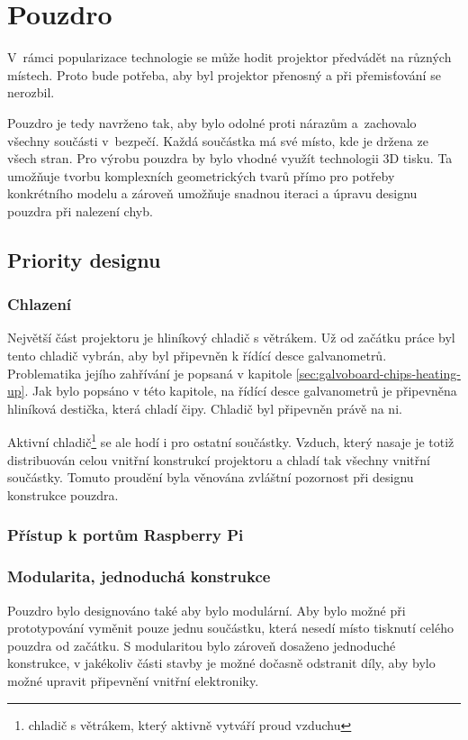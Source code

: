 \section{Pouzdro}

V~rámci popularizace technologie se může hodit projektor předvádět na různých místech. Proto bude potřeba, aby byl projektor přenosný a při přemisťování se nerozbil.

Pouzdro je tedy navrženo tak, aby bylo odolné proti nárazům a~zachovalo všechny součásti v~bezpečí. Každá součástka má své místo, kde je držena ze všech stran. Pro výrobu pouzdra by bylo vhodné využít technologii 3D tisku. Ta umožňuje tvorbu komplexních geometrických tvarů přímo pro potřeby konkrétního modelu a zároveň umožňuje snadnou iteraci a úpravu designu pouzdra při nalezení chyb.

\subsection{Priority designu} \label{sec:krabick-design-priorities}
\subsubsection{Chlazení}
Největší část projektoru je hliníkový chladič s větrákem. Už od začátku práce byl tento chladič vybrán, aby byl připevněn k řídící desce galvanometrů. Problematika jejího zahřívání je popsaná v kapitole \ref{sec:galvoboard-chips-heating-up}.
Jak bylo popsáno v této kapitole, na řídící desce galvanometrů je připevněna hliníková destička, která chladí čipy. Chladič byl připevněn právě na ni.

Aktivní chladič\footnote{chladič s větrákem, který aktivně vytváří proud vzduchu} se ale hodí i pro ostatní součástky. Vzduch, který nasaje je totiž distribuován celou vnitřní konstrukcí projektoru a chladí tak všechny vnitřní součástky. Tomuto proudění byla věnována zvláštní pozornost při designu konstrukce pouzdra.

\subsubsection{Přístup k portům Raspberry Pi}


\subsubsection{Modularita, jednoduchá konstrukce}
Pouzdro bylo designováno také aby bylo modulární. Aby bylo možné při prototypování vyměnit pouze jednu součástku, která nesedí místo tisknutí celého pouzdra od začátku. S modularitou bylo zároveň dosaženo jednoduché konstrukce, v jakékoliv části stavby je možné dočasně odstranit díly, aby bylo možné upravit připevnění vnitřní elektroniky.

